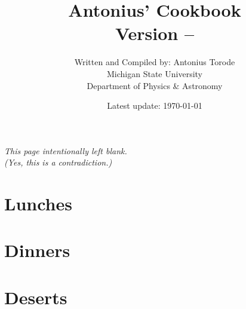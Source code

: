 \documentclass[a4paper,11pt]{book}
\title{{\huge \textbf{Antonius' Cookbook} \\ \textbf{Version -- \Version}} \\ \vspace{1cm}
}
\author{Written and Compiled by: Antonius Torode \\ Michigan State University \\ Department of Physics \& Astronomy}
\date{Latest update: \today}
\begin{document}
	
\AddToShipoutPicture*{\CoverPic}

\setlength{\parindent}{0pt}
\frontmatter
\clearpage
\maketitle

\tableofcontents
\newpage
\vspace*{\fill}
\begin{center}
	\textit{This page intentionally left blank. \\ (Yes, this is a contradiction.)}
\end{center}
\vspace*{\fill}

\mainmatter
\pagestyle{fancy}





\chapter{Lunches}




\chapter{Dinners}




\chapter{Deserts}




\backmatter
\end{document}
